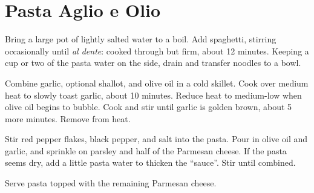 \section{Pasta Aglio e Olio}
\begin{recipe}




	Bring a large pot of lightly salted water to a boil. Add spaghetti, stirring occasionally until \textit{al dente}: cooked through but firm, about 12 minutes. Keeping a cup or two of the pasta water on the side, drain and transfer noodles to a bowl.

	Combine garlic, optional shallot, and olive oil in a cold skillet. Cook over medium heat to slowly toast garlic, about 10 minutes. Reduce heat to medium-low when olive oil begins to bubble. Cook and stir until garlic is golden brown, about 5 more minutes. Remove from heat.

	Stir red pepper flakes, black pepper, and salt into the pasta. Pour in olive oil and garlic, and sprinkle on parsley and half of the Parmesan cheese. If the pasta seems dry, add a little pasta water to thicken the ``sauce''. Stir until combined.

	Serve pasta topped with the remaining Parmesan cheese.

\end{recipe}
